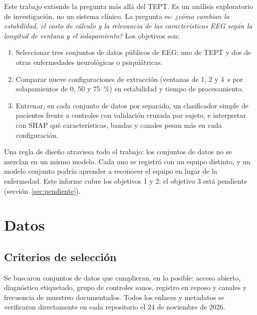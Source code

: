 \documentclass[11pt,a4paper]{article}
\begin{document}
Este trabajo extiende la pregunta más allá del TEPT. Es un análisis exploratorio de investigación, no un sistema clínico. La pregunta es: \emph{¿cómo cambian la estabilidad, el costo de cálculo y la relevancia de las características EEG según la longitud de ventana y el solapamiento?} Los objetivos son:
\begin{enumerate}
  \item Seleccionar tres conjuntos de datos públicos de EEG: uno de TEPT y dos de otras enfermedades neurológicas o psiquiátricas.
  \item Comparar nueve configuraciones de extracción (ventanas de 1, 2 y 4~s por solapamientos de 0, 50 y 75~\%) en estabilidad y tiempo de procesamiento.
  \item Entrenar, en cada conjunto de datos por separado, un clasificador simple de pacientes frente a controles con validación cruzada por sujeto, e interpretar con SHAP qué características, bandas y canales pesan más en cada configuración.
\end{enumerate}

Una regla de diseño atraviesa todo el trabajo: los conjuntos de datos no se mezclan en un mismo modelo. Cada uno se registró con un equipo distinto, y un modelo conjunto podría aprender a reconocer el equipo en lugar de la enfermedad. Este informe cubre los objetivos 1 y 2; el objetivo 3 está pendiente (sección~\ref{sec:pendiente}).

\section{Datos}

\subsection{Criterios de selección}
Se buscaron conjuntos de datos que cumplieran, en lo posible: acceso abierto, diagnóstico etiquetado, grupo de controles sanos, registro en reposo y canales y frecuencia de muestreo documentados. Todos los enlaces y metadatos se verificaron directamente en cada repositorio el 24 de noviembre de 2026.
\end{document}
